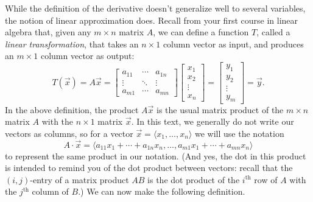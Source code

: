 While the definition of the derivative doesn't generalize well to several variables, the notion of linear approximation does. Recall from your first course in linear algebra that, given any $m\times n$ matrix $A$, we can define a function $T$, called a \emph{linear transformation}, that takes an $n\times 1$ column vector as input, and produces an $m\times 1$ column vector as output:
\[
T(\vec{x}) = A\vec{x} = 
	\begin{bmatrix} 
		a_{11} & \cdots & a_{1n}\\
		\vdots & \ddots & \vdots \\
		a_{m1} & \cdots & a_{mn}
	\end{bmatrix}
	\begin{bmatrix}x_1\\x_2\\ \vdots\\x_n\end{bmatrix}
	 = \begin{bmatrix}y_1\\y_2\\ \vdots \\y_m\end{bmatrix}=\vec{y}.
\]
In the above definition, the product $A\vec{x}$ is the usual matrix product of the $m\times n$ matrix $A$ with the $n\times 1$ matrix $\vec{x}$. In this text, we generally do not write our vectors as columns, so for a vector $\vec{x}=\langle x_1,\ldots, x_n\rangle$ we will use the notation
\[
A\cdot \vec{x} =\langle a_{11}x_1+\cdots + a_{1n}x_n, \ldots, a_{m1}x_1+\cdots +a_{mn}x_n\rangle
\]
to represent the same product in our notation. (And yes, the dot in this product is intended to remind you of the dot product between vectors: recall that the $(i,j)$-entry of a matrix product $AB$ is the dot product of the $i^{\text{th}}$ row of $A$ with the $j^{\text{th}}$ column of $B$.) We can now make the following definition.\\


\\

